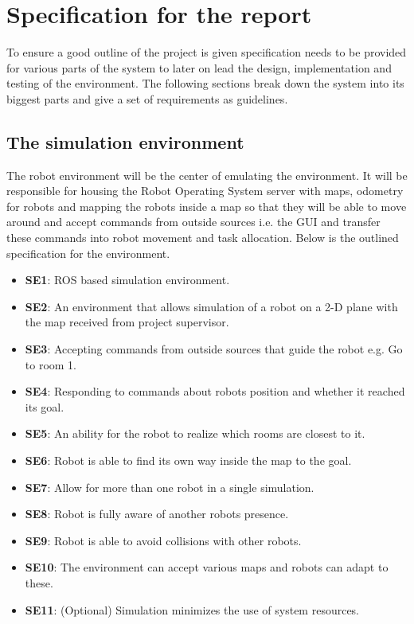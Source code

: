 \chapter{Specification for the report}
    To ensure a good outline of the project is given specification needs to be provided for various parts of the system to later on lead the design, implementation and testing of the environment. The following sections break down the system into its biggest parts and give a set of requirements as guidelines.

    \section{The simulation environment}
      The robot environment will be the center of emulating the environment. It will be responsible for housing the Robot Operating System server with maps, odometry for robots and mapping the robots inside a map so that they will be able to move around and accept commands from outside sources i.e. the GUI and transfer these commands into robot movement and task allocation. Below is the outlined specification for the environment.

      \begin{itemize}
        \item \textbf{SE1}: ROS based simulation environment.
        \item \textbf{SE2}: An environment that allows simulation of a robot on a 2-D plane with the map received from project supervisor.
        \item \textbf{SE3}: Accepting commands from outside sources that guide the robot e.g. Go to room 1.
        \item \textbf{SE4}: Responding to commands about robots position and whether it reached its goal.
        \item \textbf{SE5}: An ability for the robot to realize which rooms are closest to it.
        \item \textbf{SE6}: Robot is able to find its own way inside the map to the goal.
        \item \textbf{SE7}: Allow for more than one robot in a single simulation.
        \item \textbf{SE8}: Robot is fully aware of another robots presence.
        \item \textbf{SE9}: Robot is able to avoid collisions with other robots.
        \item \textbf{SE10}: The environment can accept various maps and robots can adapt to these.
        \item \textbf{SE11}:  (Optional) Simulation minimizes the use of system resources.
      \end{itemize}

